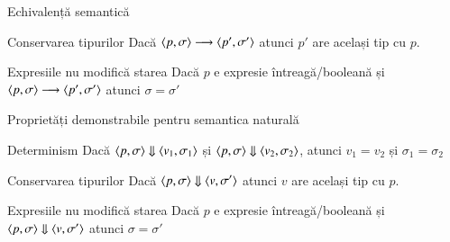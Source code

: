 \begin{section}{Echivalență semantică}
\begin{frame}
\vfill
\begin{block}{Conservarea tipurilor}
Dacă ${\langle{p, \sigma}\rangle}\longrightarrow {\ensuremath \langle{p', \sigma'}\rangle}$ atunci $p'$ are același tip cu $p$.
\end{block}

\vfill
\begin{block}{Expresiile nu modifică starea}
Dacă $p$ e expresie întreagă/booleană și ${\langle{p, \sigma}\rangle}\longrightarrow {\ensuremath \langle{p', \sigma'}\rangle}$ atunci $\sigma=\sigma'$
\end{block}
\end{frame}

\begin{frame}{Proprietăți demonstrabile pentru semantica naturală}
\begin{block}{Determinism}  
Dacă $\displaystyle{\ensuremath {{\langle{p, \sigma}\rangle}} \Downarrow {{\ensuremath \langle{v_1, \sigma_1}\rangle}}}$  și $\displaystyle{\ensuremath {{\langle{p, \sigma}\rangle}} \Downarrow {{\ensuremath \langle{v_2, \sigma_2}\rangle}}}$, atunci $v_1 = v_2$ și $\sigma_1 = \sigma_2$
\end{block}

\vfill
\begin{block}{Conservarea tipurilor}
Dacă $\displaystyle{\ensuremath {{\langle{p, \sigma}\rangle}} \Downarrow {{\ensuremath \langle{v, \sigma'}\rangle}}}$ atunci $v$ are același tip cu $p$.
\end{block}

\vfill
\begin{block}{Expresiile nu modifică starea}
Dacă $p$ e expresie întreagă/booleană și $\displaystyle{\ensuremath {{\langle{p, \sigma}\rangle}} \Downarrow {{\ensuremath \langle{v, \sigma'}\rangle}}}$ atunci $\sigma=\sigma'$
\end{block}
\end{frame}



\end{section}
